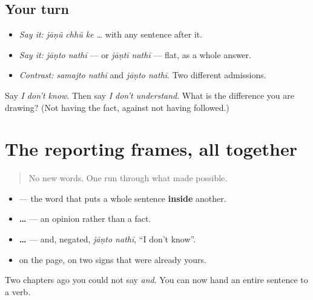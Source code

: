 \subsection*{Your turn}
\begin{itemize}
\raggedright
  \item \emph{Say it:} \emph{jāṇũ chhũ ke …} with any sentence after it.
  \item \emph{Say it:} \emph{jāṇto nathī} — or \emph{jāṇtī nathī} — flat, as a whole answer.
  \item \emph{Contrast:} \emph{samajto nathī} and \emph{jāṇto nathī}. Two different admissions.
\end{itemize}

\begin{tcolorbox}[breakable,colback=teal!4,colframe=teal!35!black,title={Before you move on}]
Say \emph{I don't know}. Then say \emph{I don't understand}. What is the difference you are drawing? (Not having the fact, against not having followed.)
\end{tcolorbox}
\section[Practice]{The reporting frames, all together}

\label{lesson:GU-C33-ke-checkpoint}



\begin{quote}
No new words. One run through what \textbf{} made possible.
\end{quote}

\begin{grammarlens}[title={What you've built}]
\begin{itemize}
\raggedright
  \item \textbf{} — the word that puts a whole sentence \textbf{inside} another.
  \item \textbf{   …} — an opinion rather than a fact.
  \item \textbf{   …} — and, negated, \emph{jāṇto nathī}, \textquotedblleft{}I don't know\textquotedblright{}.
  \item \textbf{} on the page, on two signs that were already yours.
\end{itemize}

Two chapters ago you could not say \emph{and}. You can now hand an entire sentence to a verb.
\end{grammarlens}

